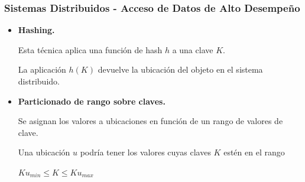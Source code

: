 \begin{frame}
    \frametitle{Sistemas Distribuidos - Acceso de Datos de Alto Desempeño}

    \begin{itemize}
        \item \textbf{Hashing.}

        Esta técnica aplica una función de hash $h$ a una clave $K$.

         
    
        La aplicación $h(K)$ devuelve la ubicación del objeto en el sistema distribuido.

         
        
        \item \textbf{Particionado de rango sobre claves.} 

        Se asignan los valores a ubicaciones en función de un rango de valores de clave.

         

        Una ubicación $u$ podría tener los valores cuyas claves $K$ estén en el rango
        
        \begin{center}
            $Ku_{min} \leq K \leq Ku_{max}$
        \end{center}
        
    \end{itemize}
\end{frame}

